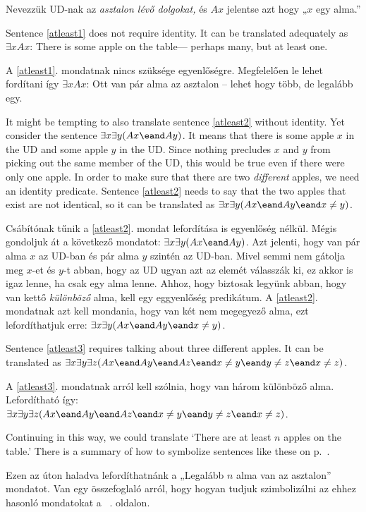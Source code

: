 Nevezzük UD-nak az \emph{asztalon lévő dolgokat,} és $Ax$ jelentse azt hogy „$x$ egy alma.”

Sentence \ref{atleast1} does not require identity. It can be translated adequately as $\exists x Ax$: There is some apple on the table--- perhaps many, but at least one.

A \ref{atleast1}. mondatnak nincs szüksége egyenlőségre. Megfelelően le lehet fordítani így $\exists x Ax$: Ott van pár alma az asztalon -- lehet hogy több, de legalább egy.

It might be tempting to also translate sentence \ref{atleast2} without identity. Yet consider the sentence $\exists x \exists y(Ax \eand Ay)$. It means that there is some apple $x$ in the UD and some apple $y$ in the UD. Since nothing precludes $x$ and $y$ from picking out the same member of the UD, this would be true even if there were only one apple. In order to make sure that there are two \emph{different} apples, we need an identity predicate. Sentence \ref{atleast2} needs to say that the two apples that exist are not identical, so it can be translated as $\exists x \exists y(Ax \eand Ay \eand x\neq y)$.

Csábítónak tűnik a \ref{atleast2}. mondat lefordítása is egyenlőség nélkül. Mégis gondoljuk át a következő mondatot: $\exists x \exists y(Ax \eand Ay)$. Azt jelenti, hogy van pár alma $x$ az UD-ban és pár alma $y$ szintén az UD-ban. Mivel semmi nem gátolja meg $x$-et és $y$-t abban, hogy az UD ugyan azt az elemét válasszák ki, ez akkor is igaz lenne, ha csak egy alma lenne. Ahhoz, hogy biztosak legyünk abban, hogy van kettő \emph{különböző} alma, kell egy eggyenlőség predikátum. A \ref{atleast2}. mondatnak azt kell mondania, hogy van két nem megegyező alma, ezt lefordíthatjuk erre: $\exists x \exists y(Ax \eand Ay \eand x\neq y)$.

Sentence \ref{atleast3} requires talking about three different apples. It can be translated as $\exists x \exists y\exists z(Ax \eand Ay \eand Az \eand x\neq y \eand y\neq z \eand x \neq z)$.

A \ref{atleast3}. mondatnak arról kell szólnia, hogy van három különböző alma. Lefordítható így: $\exists x \exists y\exists z(Ax \eand Ay \eand Az \eand x\neq y \eand y\neq z \eand x \neq z)$.

Continuing in this way, we could translate `There are at least $n$ apples on the table.' There is a summary of how to symbolize sentences like these on p.~\pageref{summary.atleast}.

Ezen az úton haladva lefordíthatnánk a „Legalább $n$ alma van az asztalon” mondatot. Van egy összefoglaló arról, hogy hogyan tudjuk szimbolizálni az ehhez hasonló mondatokat a ~\pageref{summary.atleast}. oldalon.


